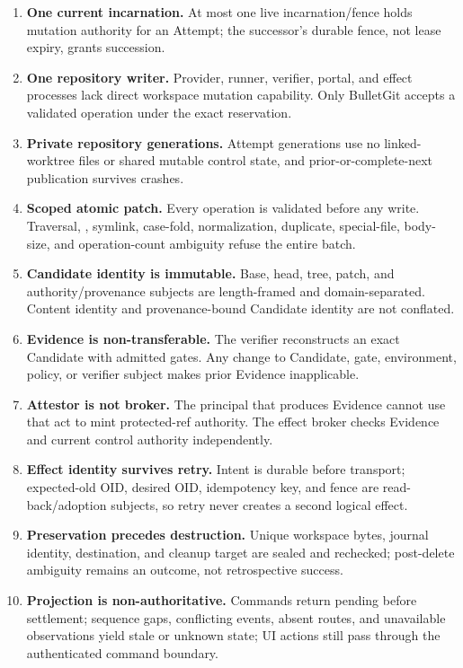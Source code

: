 \documentclass[journal]{IEEEtran}
\newcommand{\code}[1]{\texttt{\detokenize{#1}}}
\begin{document}
{\small
\begin{enumerate}
\item \textbf{One current incarnation.} At most one live incarnation/fence
holds mutation authority for an Attempt; the successor's durable fence, not
lease expiry, grants succession.
\item \textbf{One repository writer.} Provider, runner, verifier, portal, and
effect processes lack direct workspace mutation capability. Only BulletGit
accepts a validated operation under the exact reservation.
\item \textbf{Private repository generations.} Attempt generations use no
linked-worktree \code{.git} files or shared mutable control state, and
prior-or-complete-next publication survives crashes.
\item \textbf{Scoped atomic patch.} Every operation is validated before any
write. Traversal, \code{.git}, symlink, case-fold, normalization, duplicate,
special-file, body-size, and operation-count ambiguity refuse the entire batch.
\item \textbf{Candidate identity is immutable.} Base, head, tree, patch, and
authority/provenance subjects are length-framed and domain-separated. Content
identity and provenance-bound Candidate identity are not conflated.
\item \textbf{Evidence is non-transferable.} The verifier reconstructs an
exact Candidate with admitted gates. Any change to Candidate, gate,
environment, policy, or verifier subject makes prior Evidence inapplicable.
\item \textbf{Attestor is not broker.} The principal that produces Evidence
cannot use that act to mint protected-ref authority. The effect broker checks
Evidence and current control authority independently.
\item \textbf{Effect identity survives retry.} Intent is durable before
transport; expected-old OID, desired OID, idempotency key, and fence are
read-back/adoption subjects, so retry never creates a second logical effect.
\item \textbf{Preservation precedes destruction.} Unique workspace bytes,
journal identity, destination, and cleanup target are sealed and rechecked;
post-delete ambiguity remains an outcome, not retrospective success.
\item \textbf{Projection is non-authoritative.} Commands return pending before
settlement; sequence gaps, conflicting events, absent routes, and unavailable
observations yield stale or unknown state; UI actions still pass through the
authenticated command boundary.
\end{enumerate}
}
\end{document}
